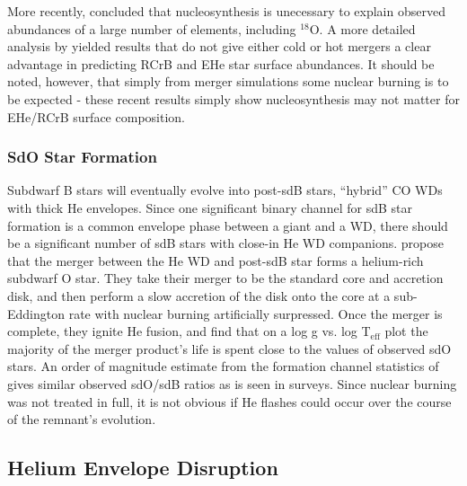 More recently, \cite{pandl11} concluded that nucleosynthesis is unecessary to explain observed abundances of a large number of elements, including $^{18}$O.  A more detailed analysis by \cite{jeff+11} yielded results that do not give either cold or hot mergers a clear advantage in predicting RCrB and EHe star surface abundances.  It should be noted, however, that simply from merger simulations some nuclear burning is to be expected - these recent results simply show nucleosynthesis may not matter for EHe/RCrB surface composition.

\subsubsection{SdO Star Formation}

Subdwarf B stars will eventually evolve into post-sdB stars, ``hybrid'' CO WDs with thick He envelopes.  Since one significant binary channel for sdB star formation is a common envelope phase between a giant and a WD, there should be a significant number of sdB stars with close-in He WD companions.  \cite{justph11} propose that the merger between the He WD and post-sdB star forms a helium-rich subdwarf O star.  They take their merger to be the standard core and accretion disk, and then perform a slow accretion of the disk onto the core at a sub-Eddington rate with nuclear burning artificially surpressed.  Once the merger is complete, they ignite He fusion, and find that on a log g vs. log T$_{\mathrm{eff}}$ plot the majority of the merger product's life is spent close to the values of observed sdO stars.  An order of magnitude estimate from the formation channel statistics of \cite{han+03} gives similar observed sdO/sdB ratios as is seen in surveys.  Since nuclear burning was not treated in full, it is not obvious if He flashes could occur over the course of the remnant's evolution.


\subsection{Helium Envelope Disruption}
\label{ssec:heliumenvelopedisruption}

